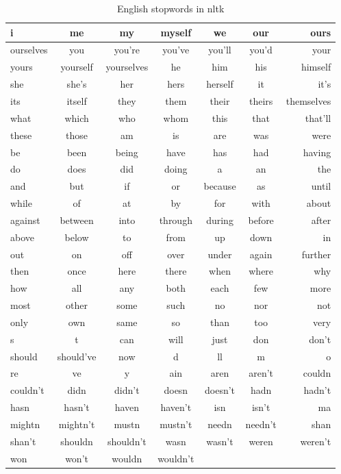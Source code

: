 \begin{table}
\begin{center}
\caption{English stopwords in nltk}
\label{tbl:stop_words}
\begin{tabular}{lcccccr}
\toprule
i&me&my&myself&we&our&ours\\ \hline 
ourselves&you&you're&you've&you'll&you'd&your\\ \hline 
yours&yourself&yourselves&he&him&his&himself\\ \hline 
she&she's&her&hers&herself&it&it's\\ \hline 
its&itself&they&them&their&theirs&themselves\\ \hline 
what&which&who&whom&this&that&that'll\\ \hline 
these&those&am&is&are&was&were\\ \hline 
be&been&being&have&has&had&having\\ \hline 
do&does&did&doing&a&an&the\\ \hline 
and&but&if&or&because&as&until\\ \hline 
while&of&at&by&for&with&about\\ \hline 
against&between&into&through&during&before&after\\ \hline 
above&below&to&from&up&down&in\\ \hline 
out&on&off&over&under&again&further\\ \hline 
then&once&here&there&when&where&why\\ \hline 
how&all&any&both&each&few&more\\ \hline 
most&other&some&such&no&nor&not\\ \hline 
only&own&same&so&than&too&very\\ \hline 
s&t&can&will&just&don&don't\\ \hline 
should&should've&now&d&ll&m&o\\ \hline 
re&ve&y&ain&aren&aren't&couldn\\ \hline 
couldn't&didn&didn't&doesn&doesn't&hadn&hadn't\\ \hline 
hasn&hasn't&haven&haven't&isn&isn't&ma\\ \hline 
mightn&mightn't&mustn&mustn't&needn&needn't&shan\\ \hline 
shan't&shouldn&shouldn't&wasn&wasn't&weren&weren't\\ \hline 
won&won't&wouldn&wouldn't\\
\bottomrule
\end{tabular}
\end{center}
\end{table}

